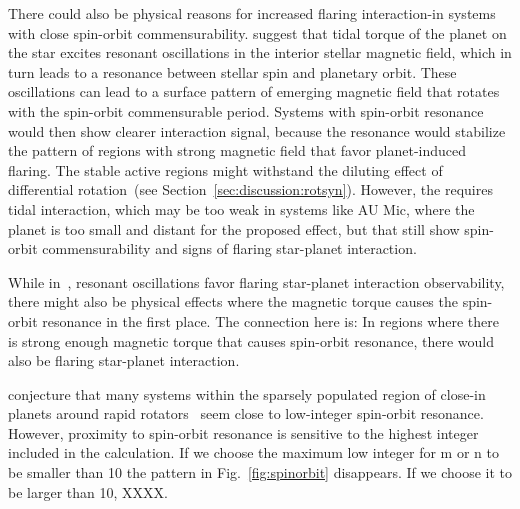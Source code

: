 \documentclass[twocolumn]{aastex631}
\begin{document}
There could also be physical reasons for increased flaring interaction-in systems with close spin-orbit commensurability. \citet{lanza2022model} suggest that tidal torque of the planet on the star excites resonant oscillations in the interior stellar magnetic field, which in turn leads to a resonance between stellar spin and planetary orbit. These oscillations can lead to a surface pattern of emerging magnetic field that rotates with the spin-orbit commensurable period. Systems with spin-orbit resonance would then show clearer interaction signal, because the resonance would stabilize the pattern of regions with strong magnetic field that favor planet-induced flaring. The stable active regions might withstand the diluting effect of differential rotation~(see Section~\ref{sec:discussion:rotsyn}). However, the \citet{lanza2022model} requires tidal interaction, which may be too weak in systems like AU Mic, where the planet is too small and distant for the proposed effect, but that still show spin-orbit commensurability and signs of flaring star-planet interaction. 

While in~\citet{lanza2022model}, resonant oscillations favor flaring star-planet interaction observability, there might also be physical effects where the magnetic torque causes the spin-orbit resonance in the first place. The connection here is: In regions where there is strong enough magnetic torque that causes spin-orbit resonance, there would also be flaring star-planet interaction. 

\citet{szabo2021changing} conjecture that many systems within the sparsely populated region of close-in planets around rapid rotators~\citep{mcquillan2013stellar} seem close to low-integer spin-orbit resonance. However, proximity to spin-orbit resonance is sensitive to the highest integer included in the calculation. If we choose the maximum low integer for m or n to be smaller than 10 the pattern in Fig.~\ref{fig:spinorbit} disappears. If we choose it to be larger than 10, XXXX. 
\end{document}
